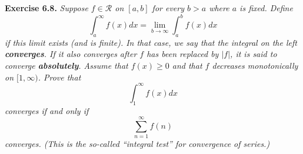 \documentclass{article}
\begin{document}



\textbf{Exercise 6.8.}
\emph{Suppose $f \in \mathscr{R}$ on $[a,b]$ for every $b > a$ where $a$ is fixed.
Define
\[
  \int_{a}^{\infty} f(x) dx
  = \lim_{b \to \infty} \int^b_a f(x) dx
\]
if this limit exists (and is finite).
In that case, we say that the integral on the left \textbf{converges}.
If it also converges after $f$ has been replaced by $|f|$,
it is said to converge \textbf{absolutely}.
Assume that $f(x) \geq 0$ and that $f$ decreases monotonically on $[1,\infty)$.
Prove that
\[
  \int_1^{\infty} f(x) dx
\]
converges if and only if
\[
  \sum_{n=1}^{\infty} f(n)
\]
converges.
(This is the so-called ``integral test'' for convergence of series.)} \\
\end{document}
